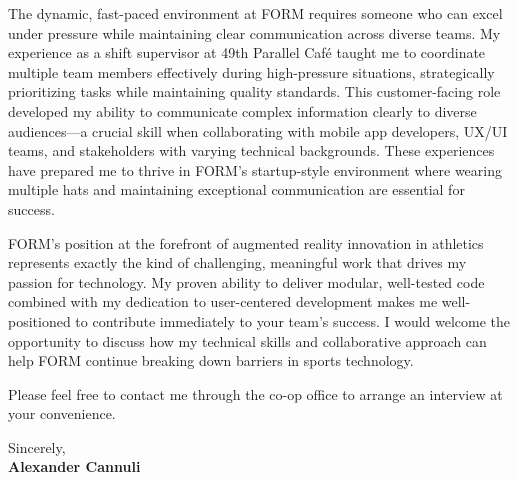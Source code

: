 \documentclass[10pt,a4paper,ragged2e,withhyper]{altacv}
\begin{document}
\vspace{1em}



The dynamic, fast-paced environment at FORM requires someone who can excel under pressure while maintaining clear communication across diverse teams. My experience as a shift supervisor at 49th Parallel Café taught me to coordinate multiple team members effectively during high-pressure situations, strategically prioritizing tasks while maintaining quality standards. This customer-facing role developed my ability to communicate complex information clearly to diverse audiences—a crucial skill when collaborating with mobile app developers, UX/UI teams, and stakeholders with varying technical backgrounds. These experiences have prepared me to thrive in FORM's startup-style environment where wearing multiple hats and maintaining exceptional communication are essential for success.

\vspace{1em}


FORM's position at the forefront of augmented reality innovation in athletics represents exactly the kind of challenging, meaningful work that drives my passion for technology. My proven ability to deliver modular, well-tested code combined with my dedication to user-centered development makes me well-positioned to contribute immediately to your team's success. I would welcome the opportunity to discuss how my technical skills and collaborative approach can help FORM continue breaking down barriers in sports technology.

Please feel free to contact me through the co-op office to arrange an interview at your convenience.

\vspace{2em}

Sincerely,\\[2em]
\textbf{Alexander Cannuli}
\end{document}
